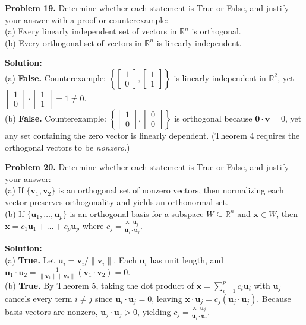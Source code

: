 \documentclass[11pt, letterpaper]{article}
\theoremstyle{definition}
\theoremstyle{remark}
\begin{document}
\textbf{Problem 19.} Determine whether each statement is True or False, and justify your answer with a proof or counterexample: \\
(a) Every linearly independent set of vectors in $\mathbb{R}^n$ is orthogonal. \\
(b) Every orthogonal set of vectors in $\mathbb{R}^n$ is linearly independent.

\textbf{Solution:} \\
(a) \textbf{False.} Counterexample: $\left\{\begin{bmatrix} 1 \\ 0 \end{bmatrix}, \begin{bmatrix} 1 \\ 1 \end{bmatrix}\right\}$ is linearly independent in $\mathbb{R}^2$, yet $\begin{bmatrix} 1 \\ 0 \end{bmatrix} \cdot \begin{bmatrix} 1 \\ 1 \end{bmatrix} = 1 \neq 0$. \\
(b) \textbf{False.} Counterexample: $\left\{\begin{bmatrix} 1 \\ 0 \end{bmatrix}, \begin{bmatrix} 0 \\ 0 \end{bmatrix}\right\}$ is orthogonal because $\mathbf{0} \cdot \mathbf{v} = 0$, yet any set containing the zero vector is linearly dependent. (Theorem 4 requires the orthogonal vectors to be \textit{nonzero}.)

\textbf{Problem 20.} Determine whether each statement is True or False, and justify your answer: \\
(a) If $\{\mathbf{v}_1, \mathbf{v}_2\}$ is an orthogonal set of nonzero vectors, then normalizing each vector preserves orthogonality and yields an orthonormal set. \\
(b) If $\{\mathbf{u}_1, \dots, \mathbf{u}_p\}$ is an orthogonal basis for a subspace $W \subseteq \mathbb{R}^n$ and $\mathbf{x} \in W$, then $\mathbf{x} = c_1\mathbf{u}_1 + \dots + c_p\mathbf{u}_p$ where $c_j = \frac{\mathbf{x} \cdot \mathbf{u}_j}{\mathbf{u}_j \cdot \mathbf{u}_j}$.

\textbf{Solution:} \\
(a) \textbf{True.} Let $\mathbf{u}_i = \mathbf{v}_i / \|\mathbf{v}_i\|$. Each $\mathbf{u}_i$ has unit length, and $\mathbf{u}_1 \cdot \mathbf{u}_2 = \frac{1}{\|\mathbf{v}_1\|\|\mathbf{v}_2\|}(\mathbf{v}_1 \cdot \mathbf{v}_2) = 0$. \\
(b) \textbf{True.} By Theorem 5, taking the dot product of $\mathbf{x} = \sum_{i=1}^p c_i \mathbf{u}_i$ with $\mathbf{u}_j$ cancels every term $i \neq j$ since $\mathbf{u}_i \cdot \mathbf{u}_j = 0$, leaving $\mathbf{x} \cdot \mathbf{u}_j = c_j(\mathbf{u}_j \cdot \mathbf{u}_j)$. Because basis vectors are nonzero, $\mathbf{u}_j \cdot \mathbf{u}_j > 0$, yielding $c_j = \frac{\mathbf{x} \cdot \mathbf{u}_j}{\mathbf{u}_j \cdot \mathbf{u}_j}$.
\end{document}
